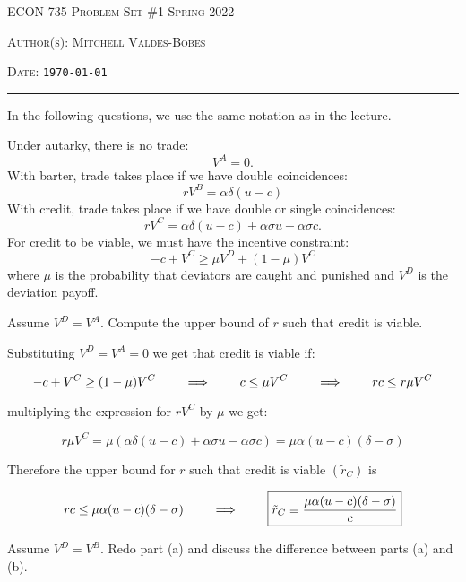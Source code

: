 \documentclass[12pt]{amsart}
\begin{document}
\thispagestyle{empty}


{\scshape ECON-735} \hfill {\scshape \Large Problem Set \#1} \hfill {\scshape Spring 2022}\\
{\scshape Author(s): \hfill Mitchell Valdes-Bobes\\
{\scshape Date: \hfill \texttt{\today}
\medskip

\hrule
\bigskip

\bigskip
In the following questions, we use the same notation as in the lecture.
\begin{exercise}
    Under autarky, there is no trade:
    $$
        V^{A}=0 .
    $$
    With barter, trade takes place if we have double coincidences:
    $$
        r V^{B}=\alpha \delta(u-c)
    $$
    With credit, trade takes place if we have double or single coincidences:
    $$
        r V^{C}=\alpha \delta(u-c)+\alpha \sigma u-\alpha \sigma c .
    $$
    For credit to be viable, we must have the incentive constraint:
    $$
        -c+V^{C} \geq \mu V^{D}+(1-\mu) V^{C}
    $$
    where $\mu$ is the probability that deviators are caught and punished and $V^{D}$ is the deviation payoff.
\end{exercise}

\begin{subexercise}
    Assume $V^{D}=V^{A}$. Compute the upper bound of $r$ such that credit is viable.
\end{subexercise}

\begin{answer}
 Substituting  $V^{D}=V^{A}=0$ we get that credit is viable if:
 
 $$ -c+V^{C} \geq (1-\mu) V^{C}  \qquad \implies \qquad c  \leq \mu V^C \qquad \implies \qquad  r c  \leq r \mu V^C$$ 
 
 multiplying the expression for $rV^C$ by $\mu$ we get:
 
 $$ r \mu V^{C}= \mu (\alpha \delta(u-c)+\alpha \sigma u-\alpha \sigma c ) = \mu\alpha(u-c)(\delta -\sigma ) $$
 
 Therefore the upper bound for $r$ such that credit is viable $(\tilde{r}_C)$ is  
 
 $$r c \leq   \mu\alpha(u-c)(\delta -\sigma ) \qquad \implies \qquad \boxed{\tilde{r}_C \equiv \frac{ \mu\alpha(u-c)(\delta -\sigma )}{c}}$$
 
\end{answer}

\begin{subexercise}
    Assume $V^{D}=V^{B}$. Redo part (a) and discuss the difference between parts (a) and (b).
\end{subexercise}

}}
\end{document}

